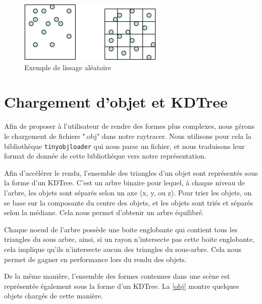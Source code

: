 \documentclass{article}
\begin{document}
\begin{figure}[h]
\begin{center}
  \includegraphics{images/smoothing.png}
  \caption{Exemple de lissage aléatoire\label{smooth}}
\end{center}
\end{figure}


\section{Chargement d'objet et KDTree}

Afin de proposer à l'utilisateur de rendre des formes plus complexes, nous
gérons le chargement de fichiers ".obj" dans notre raytracer. Nous utilisons
pour cela la bibliothèque \texttt{tinyobjloader} qui nous parse un fichier, et
nous traduisons leur format de donnée de cette bibliothèque vers notre
représentation.

Afin d'accélérer le rendu, l'ensemble des triangles d'un objet sont représentés
sous la forme d'un KDTree. C'est un arbre binaire pour lequel, à chaque niveau
de l'arbre, les objets sont séparés selon un axe (x, y, ou z). Pour trier les
objets, on se base sur la composante du centre des objets, et les objets sont
triés et séparés selon la médiane. Cela nous permet d'obtenir un arbre
équilibré.

Chaque noeud de l'arbre possède une boite englobante qui contient tous les
triangles du sous arbre, ainsi, si un rayon n'intersecte pas cette boite
englobante, cela implique qu'ils n'intersecte aucun des triangles du
sous-arbre. Cela nous permet de gagner en performance lors du rendu des objets.

De la même manière, l'ensemble des formes contenues dans une scène est
représentée également sous la forme d'un KDTree. La \cref{obj} montre
quelques objets chargés de cette manière.
\end{document}
